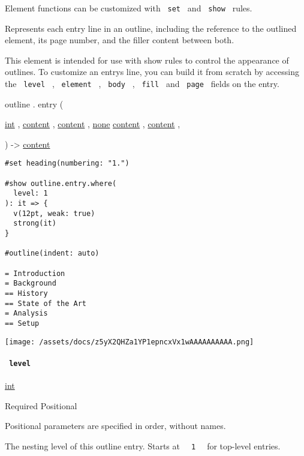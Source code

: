 \label{definitions-entry-element-tooltip}
Element functions can be customized with \texttt{\ set\ } and
\texttt{\ show\ } rules.

Represents each entry line in an outline, including the reference to the
outlined element, its page number, and the filler content between both.

This element is intended for use with show rules to control the
appearance of outlines. To customize an entry\textquotesingle s line,
you can build it from scratch by accessing the \texttt{\ level\ } ,
\texttt{\ element\ } , \texttt{\ body\ } , \texttt{\ fill\ } and
\texttt{\ page\ } fields on the entry.

outline { . } { entry } (

{ \href{/docs/reference/foundations/int/}{int} , } {
\href{/docs/reference/foundations/content/}{content} , } {
\href{/docs/reference/foundations/content/}{content} , } {
\href{/docs/reference/foundations/none/}{none}
\href{/docs/reference/foundations/content/}{content} , } {
\href{/docs/reference/foundations/content/}{content} , }

) -\textgreater{} \href{/docs/reference/foundations/content/}{content}

\begin{verbatim}
#set heading(numbering: "1.")

#show outline.entry.where(
  level: 1
): it => {
  v(12pt, weak: true)
  strong(it)
}

#outline(indent: auto)

= Introduction
= Background
== History
== State of the Art
= Analysis
== Setup
\end{verbatim}

\texttt{[image: /assets/docs/z5yX2QHZa1YP1epncxVx1wAAAAAAAAAA.png]}

\paragraph{\texorpdfstring{\texttt{\ level\ }}{ level }}\label{definitions-entry-level}

\href{/docs/reference/foundations/int/}{int}

{Required} {{ Positional }}

\label{definitions-entry-level-positional-tooltip}
Positional parameters are specified in order, without names.

The nesting level of this outline entry. Starts at
\texttt{\ }{\texttt{\ 1\ }}\texttt{\ } for top-level entries.

